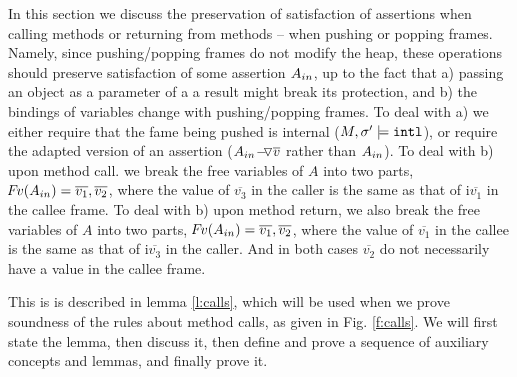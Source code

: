 In this section we  discuss the preservation of satisfaction of assertions when calling methods or returning from methods -- \ie when pushing or popping  frames. 
Namely, since  pushing/popping frames  do not modify the heap, these operations should preserve satisfaction of some assertion $A_{in}$, up to the fact that a) passing an object as a parameter of a a result might break its protection, and 
b) the bindings of variables change  with pushing/popping frames.
To deal with a) we either require that the fame being pushed is internal ($M, \sigma' \models \mbox{\normalfont{\texttt{intl}}}$), or require the adapted version of an assertion (\ie  ${ { A_{in}} \!-\!\!\!\,\!{\triangledown} \overline{v} }$ rather than $A_{in}$).
To deal with b) upon method call. we break the free variables of $A$ into two parts, \ie ${\hspace{-1pt}F\hspace{-1pt}}v(A_{in}) =  \overline{v_1}, \overline{v_2}$, where the value of $\overline{v_3}$ in the caller is the same as that of  i$\overline{v_1}$ in the callee frame.
To deal with b) upon method return, we also break the free variables of $A$ into two parts, \ie ${\hspace{-1pt}F\hspace{-1pt}}v(A_{in}) =  \overline{v_1}, \overline{v_2}$, where the value of $\overline{v_1}$ in the callee is the same as that of  i$\overline{v_3}$ in the caller.
And in both cases   $\overline {v_2}$ do not necessarily have a value in the callee frame.

This is is described in  lemma \ref{l:calls}, 
 which will be used when we prove soundness of the rules about method calls, as given in Fig. \ref{f:calls}. 
We will first state  the lemma,
then discuss it,   then    define and prove a sequence of auxiliary concepts and 
 lemmas, and finally prove it.  
 
